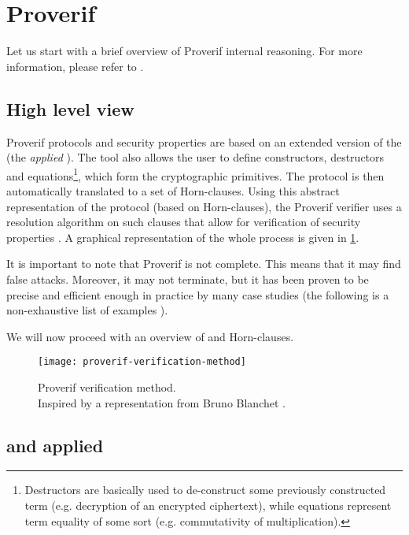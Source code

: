 
\section{Proverif}
Let us start with a brief overview of Proverif internal reasoning. For more information, please refer to \cite{SymbolicComputationalBlanchet, SymbolicVerificationBlanchet, ProverifManual}.

\subsection{High level view}
Proverif protocols and security properties are based on an extended version of the \pic (the \textit{applied} \pic). The tool also allows the user to define constructors, destructors and equations\footnote{Destructors are basically used to de-construct some previously constructed term (e.g. decryption of an encrypted ciphertext), while equations represent term equality of some sort (e.g. commutativity of multiplication).}, which form the cryptographic primitives. The protocol is then automatically translated to a set of Horn-clauses. Using this abstract representation of the protocol (based on Horn-clauses), the Proverif verifier uses a resolution algorithm on such clauses that allow for verification of security properties \cite{SymbolicComputationalBlanchet}.
A graphical representation of the whole process is given in \cref{fig:proverif-verification-method}.

It is important to note that Proverif is not complete. This means that it may find false attacks. Moreover, it may not terminate, but it has been proven to be precise and efficient enough in practice by many case studies (the following is a non-exhaustive list of examples \cite{10.1145/1266977.1266978, ABADI20053, hal-01575923, MTProto2-Proverif}).

We will now proceed with an overview of \pic and Horn-clauses.

\begin{figure}[t]
  \texttt{[image: proverif-verification-method]}
  \centering
  \caption{Proverif verification method.\\Inspired by a representation from Bruno Blanchet \cite{SymbolicComputationalBlanchet}.}
  \label{fig:proverif-verification-method}
\end{figure}

\subsection{\pic and applied \pic}

